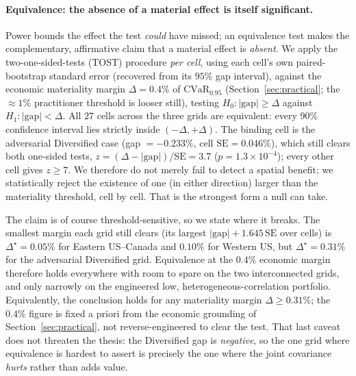 \documentclass[12pt]{article}
\newcommand{\CVaR}{\mathrm{CVaR}}
\begin{document}
\paragraph{Equivalence: the absence of a material effect is itself significant.}
Power bounds the effect the test \emph{could} have missed; an equivalence test makes
the complementary, affirmative claim that a material effect is \emph{absent}. We
apply the two-one-sided-tests (TOST) procedure \citep{schuirmann1987,lakens2018}
\emph{per cell}, using each cell's own paired-bootstrap standard error (recovered
from its $95\%$ gap interval), against the economic materiality margin
$\Delta=0.4\%$ of $\CVaR_{0.95}$ (Section~\ref{sec:practical}; the $\approx1\%$
practitioner threshold is looser still), testing
$H_0\!:\lvert\text{gap}\rvert\ge\Delta$ against $H_1\!:\lvert\text{gap}\rvert<\Delta$.
All $27$ cells across the three grids are equivalent: every $90\%$ confidence
interval lies strictly inside $(-\Delta,+\Delta)$. The binding cell is the
adversarial Diversified case (gap $=-0.233\%$, cell $\mathrm{SE}=0.046\%$), which
still clears both one-sided tests, $z=(\Delta-\lvert\text{gap}\rvert)/\mathrm{SE}
=3.7$ ($p=1.3\times10^{-4}$); every other cell gives $z\ge7$. We therefore do not
merely fail to detect a spatial benefit; we statistically reject the existence of
one (in either direction) larger than the materiality threshold, cell by cell. That
is the strongest form a null can take.

The claim is of course threshold-sensitive, so we state where it breaks. The
smallest margin each grid still clears (its largest $\lvert\text{gap}\rvert+
1.645\,\mathrm{SE}$ over cells) is $\Delta^\star=0.05\%$ for Eastern US--Canada and
$0.10\%$ for Western US, but $\Delta^\star=0.31\%$ for the adversarial Diversified
grid. Equivalence at the $0.4\%$ economic margin therefore holds everywhere with
room to spare on the two interconnected grids, and only narrowly on the engineered
low, heterogeneous-correlation portfolio. Equivalently, the conclusion holds for any
materiality margin $\Delta\ge0.31\%$; the $0.4\%$ figure is fixed a priori from the
economic grounding of Section~\ref{sec:practical}, not reverse-engineered to clear the
test. That last caveat does not threaten the thesis: the
Diversified gap is \emph{negative}, so the one grid where equivalence is hardest to
assert is precisely the one where the joint covariance \emph{hurts} rather than adds
value.
\end{document}
